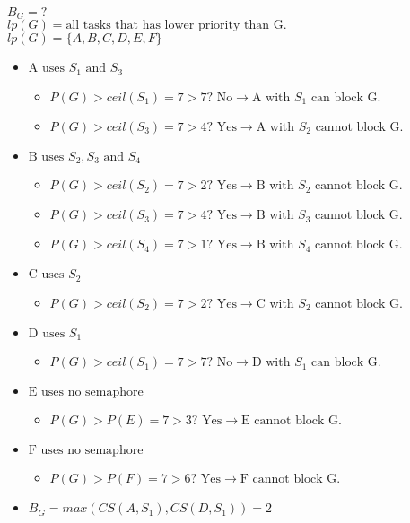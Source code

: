     $B_G = ?$\\
    $lp(G) = \text{all tasks that has lower priority than G.}$\\
    $lp(G) = \{A, B, C, D, E, F\}$
    \begin{itemize}
        \item $\text{A uses } S_1 \text{ and } S_3$
        \begin{itemize}
            \item $P(G)>ceil(S_1) = 7>7? \text{ No} \rightarrow \text{A with } S_1 \text{ can block G.}$
            \item $P(G)>ceil(S_3) = 7>4? \text{ Yes} \rightarrow \text{A with } S_2 \text{ cannot block G.}$
        \end{itemize}
        \item $\text{B uses } S_2, S_3 \text{ and } S_4$
        \begin{itemize}
            \item $P(G)>ceil(S_2) = 7>2? \text{ Yes} \rightarrow \text{B with } S_2 \text{ cannot block G.}$
            \item $P(G)>ceil(S_3) = 7>4? \text{ Yes} \rightarrow \text{B with } S_3 \text{ cannot block G.}$
            \item $P(G)>ceil(S_4) = 7>1? \text{ Yes} \rightarrow \text{B with } S_4 \text{ cannot block G.}$
        \end{itemize}
        \item $\text{C uses } S_2$
        \begin{itemize}
            \item $P(G)>ceil(S_2) = 7>2? \text{ Yes} \rightarrow \text{C with } S_2 \text{ cannot block G.}$
        \end{itemize}
        \item $\text{D uses } S_1$
        \begin{itemize}
            \item $P(G)>ceil(S_1) = 7>7? \text{ No} \rightarrow \text{D with } S_1 \text{ can block G.}$
        \end{itemize}
        \item $\text{E uses no semaphore}$
        \begin{itemize}
            \item $P(G)>P(E) = 7>3? \text{ Yes} \rightarrow \text{E cannot block G.}$
        \end{itemize}
        \item $\text{F uses no semaphore}$
        \begin{itemize}
            \item $P(G)>P(F) = 7>6? \text{ Yes} \rightarrow \text{F cannot block G.}$
        \end{itemize}
        \item $B_G = max(CS(A,S_1), CS(D,S_1)) = 2$\\
    \end{itemize}

